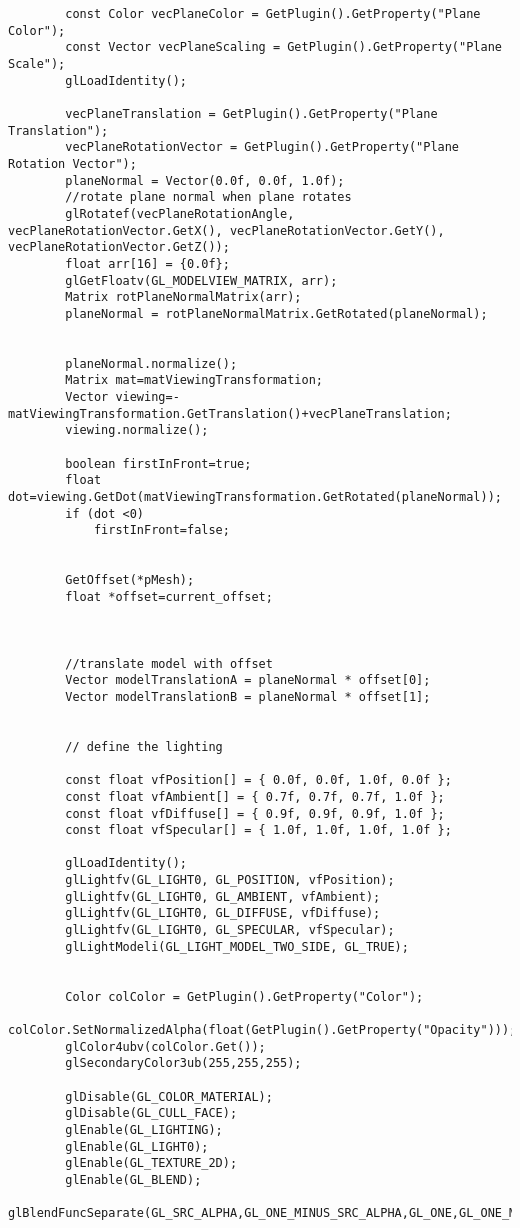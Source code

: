 \begin{verbatim}
		const Color vecPlaneColor = GetPlugin().GetProperty("Plane Color");
		const Vector vecPlaneScaling = GetPlugin().GetProperty("Plane Scale");
		glLoadIdentity();

		vecPlaneTranslation = GetPlugin().GetProperty("Plane Translation");
		vecPlaneRotationVector = GetPlugin().GetProperty("Plane Rotation Vector");
		planeNormal = Vector(0.0f, 0.0f, 1.0f);
		//rotate plane normal when plane rotates
		glRotatef(vecPlaneRotationAngle, vecPlaneRotationVector.GetX(), vecPlaneRotationVector.GetY(), vecPlaneRotationVector.GetZ());
		float arr[16] = {0.0f};
		glGetFloatv(GL_MODELVIEW_MATRIX, arr);
		Matrix rotPlaneNormalMatrix(arr);
		planeNormal = rotPlaneNormalMatrix.GetRotated(planeNormal);


		planeNormal.normalize();
		Matrix mat=matViewingTransformation;
		Vector viewing=-matViewingTransformation.GetTranslation()+vecPlaneTranslation;
		viewing.normalize();

		boolean firstInFront=true;
		float dot=viewing.GetDot(matViewingTransformation.GetRotated(planeNormal));
		if (dot <0)
			firstInFront=false;


		GetOffset(*pMesh);
		float *offset=current_offset;



		//translate model with offset
		Vector modelTranslationA = planeNormal * offset[0];
		Vector modelTranslationB = planeNormal * offset[1];


		// define the lighting

		const float vfPosition[] = { 0.0f, 0.0f, 1.0f, 0.0f };
		const float vfAmbient[] = { 0.7f, 0.7f, 0.7f, 1.0f };
		const float vfDiffuse[] = { 0.9f, 0.9f, 0.9f, 1.0f };
		const float vfSpecular[] = { 1.0f, 1.0f, 1.0f, 1.0f };

		glLoadIdentity();
		glLightfv(GL_LIGHT0, GL_POSITION, vfPosition);
		glLightfv(GL_LIGHT0, GL_AMBIENT, vfAmbient);
		glLightfv(GL_LIGHT0, GL_DIFFUSE, vfDiffuse);
		glLightfv(GL_LIGHT0, GL_SPECULAR, vfSpecular);
		glLightModeli(GL_LIGHT_MODEL_TWO_SIDE, GL_TRUE);


		Color colColor = GetPlugin().GetProperty("Color");
		colColor.SetNormalizedAlpha(float(GetPlugin().GetProperty("Opacity")));
		glColor4ubv(colColor.Get());
		glSecondaryColor3ub(255,255,255);

		glDisable(GL_COLOR_MATERIAL);
		glDisable(GL_CULL_FACE);
		glEnable(GL_LIGHTING);
		glEnable(GL_LIGHT0);
		glEnable(GL_TEXTURE_2D);
		glEnable(GL_BLEND);
		glBlendFuncSeparate(GL_SRC_ALPHA,GL_ONE_MINUS_SRC_ALPHA,GL_ONE,GL_ONE_MINUS_SRC_ALPHA);


\end{verbatim}
